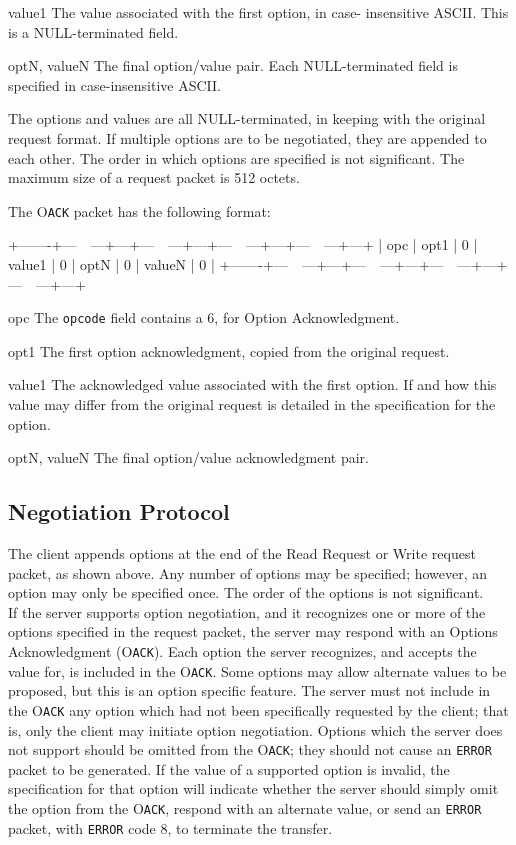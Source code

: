 \documentclass[12pt]{article}
\begin{document}
   value1
     The value associated with the first option, in case-
     insensitive ASCII. This is a NULL-terminated field.

   optN, valueN
     The final option/value pair. Each NULL-terminated field is
     specified in case-insensitive ASCII.

The options and values are all NULL-terminated, in keeping with the
original request format. If multiple options are to be negotiated,
they are appended to each other. The order in which options are
specified is not significant. The maximum size of a request packet
is 512 octets.

The O\verb|ACK| packet has the following format:

   +-------+---~~---+---+---~~---+---+---~~---+---+---~~---+---+
   | opc | opt1 | 0 | value1 | 0 | optN | 0 | valueN | 0 |
   +-------+---~~---+---+---~~---+---+---~~---+---+---~~---+---+

   opc
     The \verb|opcode| field contains a 6, for Option Acknowledgment.

   opt1
     The first option acknowledgment, copied from the original
     request.

   value1
     The acknowledged value associated with the first option. If
     and how this value may differ from the original request is
     detailed in the specification for the option.

   optN, valueN
     The final option/value acknowledgment pair.

\subsection{Negotiation Protocol}
The client appends options at the end of the Read Request or Write
request packet, as shown above. Any number of options may be
specified; however, an option may only be specified once. The order
of the options is not significant.\\

If the server supports option negotiation, and it recognizes one or
more of the options specified in the request packet, the server may
respond with an Options Acknowledgment (O\verb|ACK|). Each option the
server recognizes, and accepts the value for, is included in the
O\verb|ACK|. Some options may allow alternate values to be proposed, but
this is an option specific feature. The server must not include in
the O\verb|ACK| any option which had not been specifically requested by the
client; that is, only the client may initiate option negotiation.
Options which the server does not support should be omitted from the
O\verb|ACK|; they should not cause an  \verb|ERROR| packet to be generated. If the
value of a supported option is invalid, the specification for that
option will indicate whether the server should simply omit the option
from the O\verb|ACK|, respond with an alternate value, or send an  \verb|ERROR|
packet, with  \verb|ERROR| code 8, to terminate the transfer.\\
\end{document}

